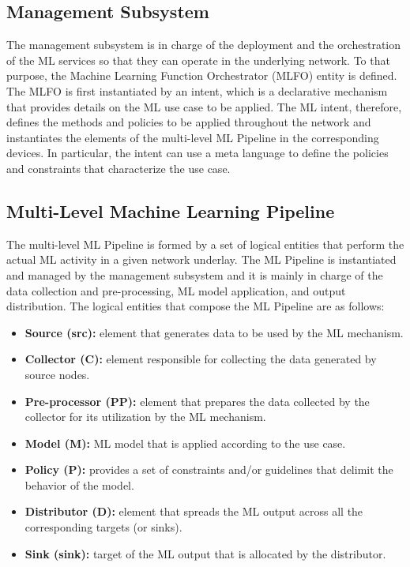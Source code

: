 \documentclass[journal]{IEEEtran}
\begin{document}
\subsection{Management Subsystem} 
The management subsystem is in charge of the deployment and the orchestration of the ML services so that they can operate in the underlying network. To that purpose, the Machine Learning Function Orchestrator (MLFO) entity is defined. The MLFO is first instantiated by an intent, which is a declarative mechanism that provides details on the ML use case to be applied. The ML intent, therefore, defines the methods and policies to be applied throughout the network and instantiates the elements of the multi-level ML Pipeline in the corresponding devices. In particular, the intent can use a meta language to define the policies and constraints that characterize the use case.

\subsection{Multi-Level Machine Learning Pipeline} 
The multi-level ML Pipeline is formed by a set of logical entities that perform the actual ML activity in a given network underlay. The ML Pipeline is instantiated and managed by the management subsystem and it is mainly in charge of the data collection and pre-processing, ML model application, and output distribution. The logical entities that compose the ML Pipeline are as follows:
\begin{itemize}
	\item \textbf{Source (src):} element that generates data to be used by the ML mechanism.
	\item \textbf{Collector (C):} element responsible for collecting the data generated by source nodes.
	\item \textbf{Pre-processor (PP):} element that prepares the data collected by the collector for its utilization by the ML mechanism.
	\item \textbf{Model (M):} ML model that is applied according to the use case.
	\item \textbf{Policy (P):} provides a set of constraints and/or guidelines that delimit the behavior of the model.
	\item \textbf{Distributor (D):} element that spreads the ML output across all the corresponding targets (or sinks).
	\item \textbf{Sink (sink):} target of the ML output that is allocated by the distributor.
\end{itemize}
\end{document}
